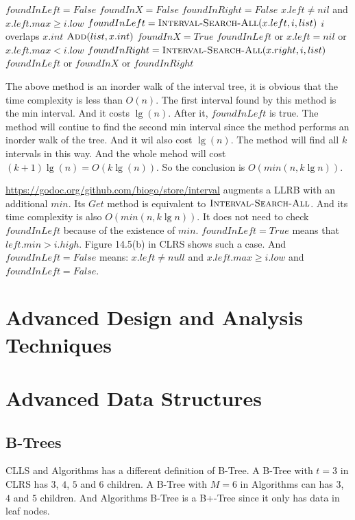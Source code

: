 \documentclass{book}
\begin{document}
\begin{CJK}{UTF8}{gkai}
\begin{codebox}
\li $foundInLeft = False$
\li $foundInX = False$
\li $foundInRight = False$
\li \If $x.left \ne nil$ and $x.left.max \ge i.low$
\li \Then $foundInLeft = \textnormal{\scshape Interval-Search-All}(x.left, i, list)$
\End
\li \If $i$ overlaps $x.int$
\li \Then $\textnormal{\scshape Add}(list, x.int)$
\li $foundInX = True$
\End
\li \If $foundInLeft$ or $x.left = nil$ or $x.left.max < i.low$
\li \Then $foundInRight = \textnormal{\scshape Interval-Search-All}(x.right, i, list)$
\End
\li \Return $foundInLeft$ or $foundInX$ or $foundInRight$
\End
\end{codebox}

The above method is an inorder walk of the interval tree, it is obvious that the time complexity is less than $O(n)$.
The first interval found by this method is the min interval. And it costs $\lg(n)$. After it, $foundInLeft$ is true. The
method will contiue to find the second min interval since the method performs an inorder walk of the tree. And it wil
also cost $\lg(n)$. The method will find all $k$ intervals in this way. And the whole mehod will cost $(k+1)\lg(n) =
O(k\lg(n))$. So the conclusion is $O(min(n, k \lg n))$.

\url{https://godoc.org/github.com/biogo/store/interval} augments a LLRB with an additional $min$. Its $Get$ method is
equivalent to $\textnormal{\scshape Interval-Search-All}$.  And its time complexity is also $O(min(n, k \lg n))$. It does not need to
check $foundInLeft$ because of the existence of $min$. $foundInLeft = True$ means that $left.min > i.high$. Figure
14.5(b) in CLRS shows such a case. And $foundInLeft = False$ means: $x.left \ne null$ and $x.left.max \ge i.low$ and $foundInLeft =
   False$.

\part{Advanced Design and Analysis Techniques}
\part{Advanced Data Structures}
\chapter{B-Trees}
CLLS and Algorithms has a different definition of B-Tree. A B-Tree with 
$t=3$ in CLRS has $3$, $4$, $5$ and $6$ children. A B-Tree with $M=6$ in Algorithms 
can has $3$, $4$ and $5$ children. And Algorithms B-Tree is a B+-Tree since it only 
has data in leaf nodes.


\end{CJK}
\end{document}
